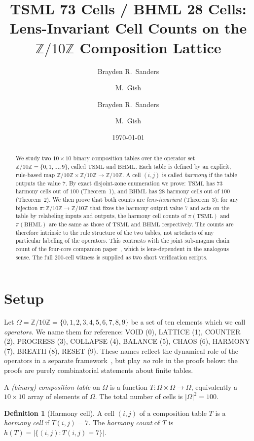 \documentclass[11pt,reqno]{amsart}
\title[TSML 73 / BHML 28 cells on $\Zten$]
  {TSML 73 Cells / BHML 28 Cells:\\
   Lens-Invariant Cell Counts on the\\
   $\mathbb{Z}/10\mathbb{Z}$ Composition Lattice}
\author{Brayden R.\ Sanders \and M.\ Gish}
\author{Brayden R.\ Sanders \and M.\ Gish}
\date{\today}
\theoremstyle{plain}
\theoremstyle{definition}
\newtheorem{definition}[theorem]{Definition}
\theoremstyle{remark}
\newcommand{\Z}{\mathbb{Z}}
\newcommand{\Zten}{\Z/10\Z}
\newcommand{\TSML}{\mathrm{TSML}}
\newcommand{\BHML}{\mathrm{BHML}}
\begin{document}
\begin{abstract}
We study two $10\times10$ binary composition tables over the
operator set $\Zten = \{0,1,\ldots,9\}$, called $\TSML$ and
$\BHML$. Each table is defined by an explicit, rule-based map
$\Zten \times \Zten \to \Zten$. A cell $(i,j)$ is called
\emph{harmony} if the table outputs the value $7$. By exact
disjoint-zone enumeration we prove:
$\TSML$ has $73$ harmony cells out of $100$ (Theorem~1), and
$\BHML$ has $28$ harmony cells out of $100$ (Theorem~2). We then
prove that both counts are \emph{lens-invariant} (Theorem~3): for
any bijection $\pi : \Zten \to \Zten$ that fixes the harmony
output value $7$ and acts on the table by relabeling inputs and
outputs, the harmony cell counts of $\pi(\TSML)$ and $\pi(\BHML)$
are the same as those of $\TSML$ and $\BHML$ respectively. The
counts are therefore intrinsic to the rule structure of the two
tables, not artefacts of any particular labeling of the
operators. This contrasts with the joint sub-magma chain count of
the four-core companion paper~\cite{J15}, which is lens-dependent
in the analogous sense. The full $200$-cell witness is supplied as
two short verification scripts.
\end{abstract}

\maketitle

\section{Setup}\label{sec:setup}

Let $\Omega = \Zten = \{0, 1, 2, 3, 4, 5, 6, 7, 8, 9\}$ be a set of
ten elements which we call \emph{operators}. We name them for
reference: VOID (0), LATTICE (1), COUNTER (2), PROGRESS (3),
COLLAPSE (4), BALANCE (5), CHAOS (6), HARMONY (7), BREATH (8),
RESET (9). These names reflect the dynamical role of the operators
in a separate framework~\cite{Sanders2026}, but play \emph{no} role
in the proofs below: the proofs are purely combinatorial statements
about finite tables.

A \emph{(binary) composition table} on $\Omega$ is a function
$T : \Omega \times \Omega \to \Omega$, equivalently a $10 \times 10$
array of elements of $\Omega$. The total number of cells is
$|\Omega|^2 = 100$.

\begin{definition}[Harmony cell]\label{def:harm}
A cell $(i, j)$ of a composition table $T$ is a \emph{harmony cell}
if $T(i, j) = 7$. The \emph{harmony count} of $T$ is
$h(T) = |\{(i, j) : T(i, j) = 7\}|$.
\end{definition}
\end{document}
